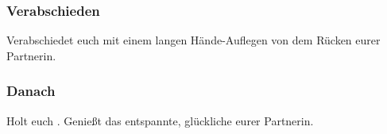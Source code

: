 \subsubsection{Verabschieden}

Verabschiedet euch mit einem langen Hände-Auflegen von dem Rücken eurer Partnerin.

\subsubsection{Danach}
\iftoggle{oel}{
  \fett{Hände ausschütteln und waschen.}
}{
  \fett{Hände ausschütteln.}
}
Holt euch . Genießt das entspannte, glückliche  eurer Partnerin.
